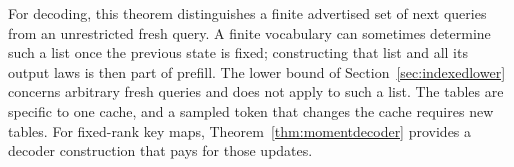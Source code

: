 For decoding, this theorem distinguishes a finite advertised set of
next queries from an unrestricted fresh query. A finite vocabulary
can sometimes determine such a list once the previous state is fixed;
constructing that list and all its output laws is then part of
prefill. The lower bound of Section~\ref{sec:indexedlower} concerns
arbitrary fresh queries and does not apply to such a list. The tables
are specific to one cache, and a sampled token that changes the cache
requires new tables. For fixed-rank key maps,
Theorem~\ref{thm:momentdecoder} provides a decoder construction that
pays for those updates.
